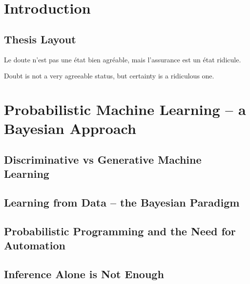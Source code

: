 
\chapter{Introduction}
\label{chp:intro}



\section{Thesis Layout}

\begin{savequote}[8cm]
	\textlatin{Le doute n'est pas une état bien agréable, mais l'assurance est un état ridicule.}
	
	Doubt is not a very agreeable status, but certainty is a ridiculous one.
\end{savequote}


\chapter{Probabilistic Machine Learning -- a Bayesian Approach}
\label{chp:bayes}


\section{Discriminative vs Generative Machine Learning}
\label{sec:bayes:discrim}



\section{Learning from Data -- the Bayesian Paradigm}
\label{sec:bayes:bayes}



\section{Probabilistic Programming and the Need for Automation}

\section{Inference Alone is Not Enough}